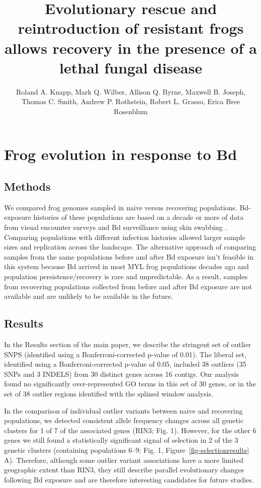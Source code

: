 \documentclass[9pt,twoside,lineno]{pnas-new}
\title{Evolutionary rescue and reintroduction of resistant frogs allows recovery in the presence of a lethal fungal disease}
\author{Roland A. Knapp, Mark Q. Wilber, Allison Q. Byrne, Maxwell B. Joseph, Thomas C. Smith, Andrew P. Rothstein, Robert L. Grasso, Erica Bree Rosenblum}
\begin{document}
\maketitle

\SItext
\hypertarget{frog-evolution-in-response-to-bd-2}{%
\section{Frog evolution in response to
Bd}\label{frog-evolution-in-response-to-bd-2}}

\hypertarget{methods}{%
\subsection{Methods}\label{methods}}

We compared frog genomes sampled in naive versus recovering populations.
Bd-exposure histories of these populations are based on a decade or more
of data from visual encounter surveys and Bd surveillance using skin
swabbing \citep[e.g.,][]{knapp2016}. Comparing populations with
different infection histories allowed larger sample sizes and
replication across the landscape. The alternative approach of comparing
samples from the same populations before and after Bd exposure isn't
feasible in this system because Bd arrived in most MYL frog populations
decades ago and population persistence/recovery is rare and
unpredictable. As a result, samples from recovering populations
collected from before and after Bd exposure are not available and are
unlikely to be available in the future.

\hypertarget{results-1}{%
\subsection{Results}\label{results-1}}

In the Results section of the main paper, we describe the stringent set
of outlier SNPS (identified using a Bonferroni-corrected p-value of
0.01). The liberal set, identified using a Bonferroni-corrected p-value
of 0.05, included 38 outliers (35 SNPs and 3 INDELS) from 30 distinct
genes across 16 contigs. Our analysis found no significantly
over-represented GO terms in this set of 30 genes, or in the set of 38
outlier regions identified with the splined window analysis.

In the comparison of individual outlier variants between naive and
recovering populations, we detected consistent allele frequency changes
across all genetic clusters for 1 of 7 of the associated genes (RIN3;
Fig. 1). However, for the other 6 genes we
still found a statistically significant signal of selection in 2 of the
3 genetic clusters (containing populations 6--9;
Fig. 1, Figure~\ref{fig-selectionresults}
A). Therefore, although some outlier variant associations have a more
limited geographic extent than RIN3, they still describe parallel
evolutionary changes following Bd exposure and are therefore interesting
candidates for future studies.
\end{document}
